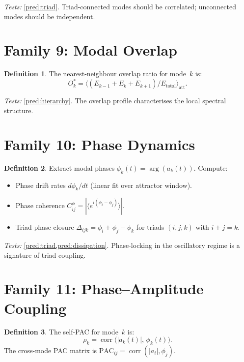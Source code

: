 \documentclass[11pt,twoside,openright]{book}
\theoremstyle{definition}
\newtheorem{definition}{Definition}[chapter]
\theoremstyle{plain}
\theoremstyle{definition}
\theoremstyle{remark}
\newcommand{\att}{\mathrm{att}}
\DeclareMathOperator{\corr}{corr}
\begin{document}
\noindent\emph{Tests:} \cref{pred:triad}. Triad-connected modes should be correlated; unconnected modes should be independent.

\section{Family 9: Modal Overlap}\label{sec:fam-overlap}

\begin{definition}\label{def:overlap}
The nearest-neighbour overlap ratio for mode~\(k\) is:
\begin{equation}\label{eq:overlap}
O_k^* = \bigl\langle (E_{k-1} + E_k + E_{k+1}) / E_{\mathrm{total}} \bigr\rangle_\att.
\end{equation}
\end{definition}

\noindent\emph{Tests:} \cref{pred:hierarchy}. The overlap profile characterises the local spectral structure.

\section{Family 10: Phase Dynamics}\label{sec:fam-phase}

\begin{definition}\label{def:phase}
Extract modal phases \(\phi_k(t) = \arg(a_k(t))\). Compute:
\begin{itemize}
\item Phase drift rates \(d\phi_k/dt\) (linear fit over attractor window).
\item Phase coherence \(C_{ij}^\phi = |\langle e^{i(\phi_i - \phi_j)} \rangle|\).
\item Triad phase closure \(\Delta_{ijk} = \phi_i + \phi_j - \phi_k\) for triads \((i,j,k)\) with \(i + j = k\).
\end{itemize}
\end{definition}

\noindent\emph{Tests:} \cref{pred:triad,pred:dissipation}. Phase-locking in the oscillatory regime is a signature of triad coupling.

\section{Family 11: Phase--Amplitude Coupling}\label{sec:fam-pac}

\begin{definition}\label{def:pac}
The self-PAC for mode~\(k\) is:
\begin{equation}\label{eq:pac}
\rho_k = \corr\bigl(|a_k(t)|,\, \phi_k(t)\bigr).
\end{equation}
The cross-mode PAC matrix is \(\mathrm{PAC}_{ij} = \corr(|a_i|, \phi_j)\).
\end{definition}
\end{document}
